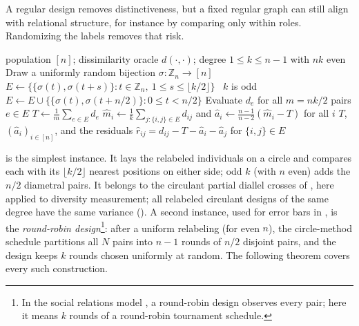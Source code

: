 \documentclass[twoside,11pt]{article}
\begin{document}
A regular design removes distinctiveness, but a fixed regular graph can
still align with relational structure, for instance by comparing only
within roles. Randomizing the labels removes that risk.

\begin{algorithm}[t]
\caption{Balanced pairwise diversity (one design; repeat $L$ times for
intervals or high-probability guarantees)}
\label{alg:balanced}
\begin{algorithmic}[1]
\Require population $[n]$; dissimilarity oracle $d(\cdot,\cdot)$; degree $1\le k\le n-1$ with $nk$ even
\State Draw a uniformly random bijection $\sigma:\mathbb{Z}_n\to[n]$
\State $E\gets\bigl\{\{\sigma(t),\sigma(t+s)\} : t\in\mathbb{Z}_n,\ 1\le s\le \lfloor k/2\rfloor\bigr\}$
\State \algorithmicif\ $k$ is odd \algorithmicthen\ $E\gets E\cup\bigl\{\{\sigma(t),\sigma(t+n/2)\} : 0\le t<n/2\bigr\}$ 
\State Evaluate $d_e$ for all $m=nk/2$ pairs $e\in E$ 
\State $T\gets \frac{1}{m}\sum_{e\in E}d_e$ 
\State $\widehat m_i\gets\frac1k\sum_{j:\{i,j\}\in E}d_{ij}$ and
$\widehat a_i\gets\frac{n-1}{n-2}(\widehat m_i-T)$ for all $i$
\State \Return $T$, $(\widehat a_i)_{i\in[n]}$, and the residuals
$\widehat r_{ij}=d_{ij}-T-\widehat a_i-\widehat a_j$ for $\{i,j\}\in E$
\end{algorithmic}
\end{algorithm}

 is the simplest instance. It lays the relabeled
individuals on a circle and compares each with its $\lfloor k/2\rfloor$ nearest positions
on either side; odd $k$ (with $n$ even) adds the $n/2$ diametral pairs. It
belongs to the circulant partial diallel crosses of
\citet{kempthorne1961partial}, here applied to diversity measurement; all
relabeled circulant designs of the same degree have the same variance
(). A second instance, used for error bars
in , is the \emph{round-robin design}\footnote{In the social
relations model \citep{kenny1984social}, a round-robin design observes every
pair; here it means $k$ rounds of a round-robin tournament schedule.}: after a uniform
relabeling (for even $n$), the circle-method schedule partitions all $N$ pairs into $n-1$
rounds of $n/2$ disjoint pairs, and the design keeps $k$ rounds chosen
uniformly at random. The following theorem covers every such construction.
\end{document}
